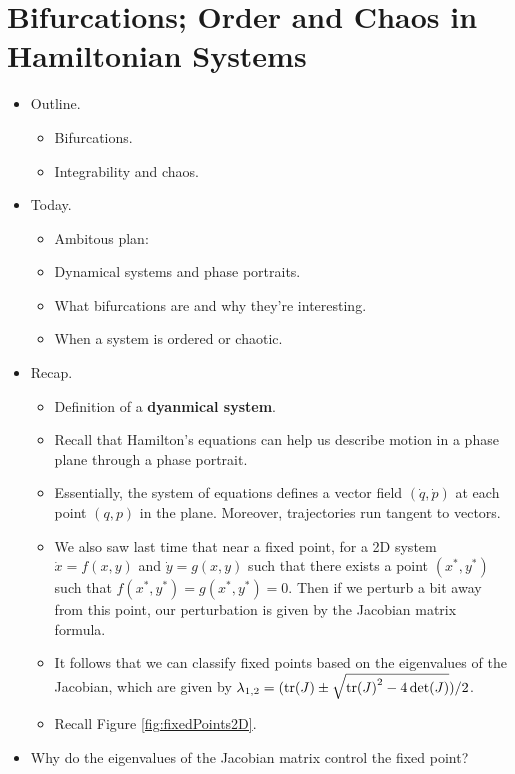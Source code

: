 \documentclass[../notes.tex]{subfiles}
\begin{document}
\section{Bifurcations; Order and Chaos in Hamiltonian Systems}
\begin{itemize}
    \item {}Outline.
    \begin{itemize}
        \item Bifurcations.
        \item Integrability and chaos.
    \end{itemize}
    \item Today.
    \begin{itemize}
        \item Ambitous plan:
        \item Dynamical systems and phase portraits.
        \item What bifurcations are and why they're interesting.
        \item When a system is ordered or chaotic.
    \end{itemize}
    \item Recap.
    \begin{itemize}
        \item Definition of a \textbf{dyanmical system}.
        \item Recall that Hamilton's equations can help us describe motion in a phase plane through a phase portrait.
        \item Essentially, the system of equations defines a vector field $(\dot{q},\dot{p})$ at each point $(q,p)$ in the plane. Moreover, trajectories run tangent to vectors.
        \item We also saw last time that near a fixed point, for a 2D system $\dot{x}=f(x,y)$ and $\dot{y}=g(x,y)$ such that there exists a point $(x^*,y^*)$ such that $f(x^*,y^*)=g(x^*,y^*)=0$. Then if we perturb a bit away from this point, our perturbation is given by the Jacobian matrix formula.
        \item It follows that we can classify fixed points based on the eigenvalues of the Jacobian, which are given by $\lambda_{1,2}=(\tr(J)\pm\sqrt{\tr(J)^2-4\det(J)})/2$.
        \item Recall Figure \ref{fig:fixedPoints2D}.
    \end{itemize}
    \item Why do the eigenvalues of the Jacobian matrix control the fixed point?
    \begin{itemize}

\end{itemize}
\end{itemize}
\end{document}
